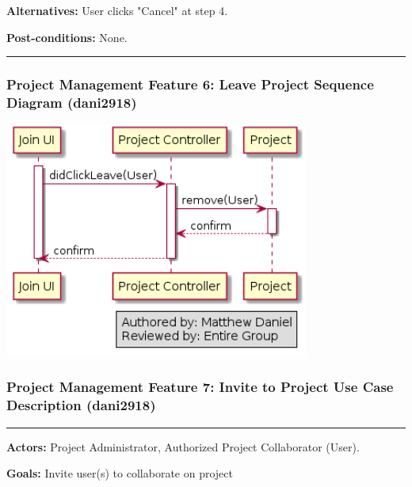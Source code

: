 \documentclass[twoside,letterpaper]{article}
\begin{document}
\noindent  \textbf{Alternatives:} User clicks "Cancel" at step 4. \newline
 
\noindent  \textbf{Post-conditions:} None. \newline
\vspace{8pt}
\hrule

\newpage

\subsubsection[Project Management Feature 6: Leave Project Sequence Diagram (dani2918)]{\rmfamily\bfseries\color{black}
	Project Management Feature 6: Leave Project Sequence Diagram  (dani2918)}

\bigskip

\includegraphics[width=10cm]{images/SequenceDiagrams/PMLeaveProject}

\newpage




\subsubsection[Project Management Feature 7: Invite to Project Use Case Description (dani2918)]{\rmfamily\bfseries\color{black}
	Project Management Feature 7: Invite to Project Use Case Description  (dani2918)}
\hypertarget{RefHeading22059017292}{}
\bigskip

\vspace{2pt}
\hrule
\vspace{8pt}
\noindent \textbf{Actors:} Project Administrator, Authorized Project Collaborator (User).  \newline

\noindent \textbf{Goals:} Invite user(s) to collaborate on project \newline
\end{document}
